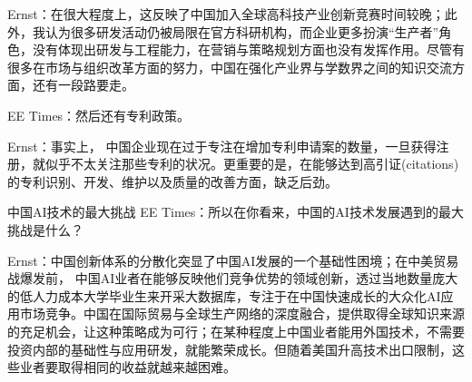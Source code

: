 \documentclass[letterpaper,10pt,english]{sphinxmanual}
\begin{document}
Ernst：在很大程度上，这反映了中国加入全球高科技产业创新竞赛时间较晚；此外，我认为很多研发活动仍被局限在官方科研机构，而企业更多扮演“生产者”角色，没有体现出研发与工程能力，在营销与策略规划方面也没有发挥作用。尽管有很多在市场与组织改革方面的努力，中国在强化产业界与学数界之间的知识交流方面，还有一段路要走。

EE Times：然后还有专利政策。

Ernst：事实上，
中国企业现在过于专注在增加专利申请案的数量，一旦获得注册，就似乎不太关注那些专利的状况。更重要的是，在能够达到高引证(citations)的专利识别、开发、维护以及质量的改善方面，缺乏后劲。

中国AI技术的最大挑战 EE
Times：所以在你看来，中国的AI技术发展遇到的最大挑战是什么？

Ernst：中国创新体系的分散化突显了中国AI发展的一个基础性困境；在中美贸易战爆发前，
中国AI业者在能够反映他们竞争优势的领域创新，透过当地数量庞大的低人力成本大学毕业生来开采大数据库，专注于在中国快速成长的大众化AI应用市场竞争。中国在国际贸易与全球生产网络的深度融合，提供取得全球知识来源的充足机会，让这种策略成为可行；在某种程度上中国业者能用外国技术，不需要投资内部的基础性与应用研发，就能繁荣成长。但随着美国升高技术出口限制，这些业者要取得相同的收益就越来越困难。
\end{document}
